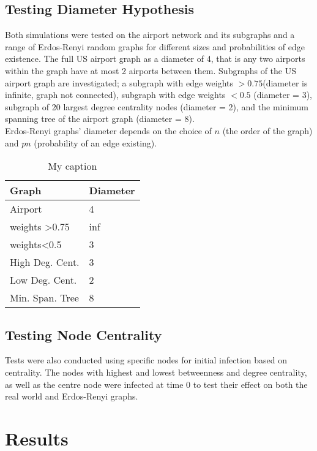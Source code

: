 \documentclass[a4paper,11pt]{article}
\begin{document}
\subsection*{Testing Diameter Hypothesis}
Both simulations were tested on the airport network and its subgraphs and a range of Erdos-Renyi random graphs for different sizes and probabilities of edge existence. The full US airport graph as a diameter of 4, that is any two airports within the graph have at most 2 airports between them. Subgraphs of the US airport graph are investigated; a subgraph with edge weights $> 0.75$(diameter is infinite, graph not connected), subgraph with edge weights $<0.5$ (diameter = 3), subgraph of 20 largest degree centrality nodes (diameter = 2), and the minimum spanning tree of the airport graph (diameter = 8).\\
Erdos-Renyi graphs' diameter depends on the choice of $n$ (the order of the graph) and $pn$ (probability of an edge existing).

\begin{table}[H]
\centering
\caption{My caption}
\label{my-label}
\begin{tabular}{|l|l|}
\hline
Graph                     & Diameter \\ \hline
\hline
Airport                   & 4        \\ \hline
weights \textgreater 0.75 & inf      \\ \hline
weights\textless0.5       & 3        \\ \hline
High Deg. Cent.           & 3        \\ \hline
Low Deg. Cent.            & 2        \\ \hline
Min. Span. Tree           & 8        \\ \hline
\end{tabular}
\end{table}

\subsection*{Testing Node Centrality}
Tests were also conducted using specific nodes for initial infection based on centrality. The nodes with highest and lowest betweenness and degree centrality, as well as the centre node were infected at time 0 to test their effect on both the real world and Erdos-Renyi graphs.

\section{Results}
\end{document}
